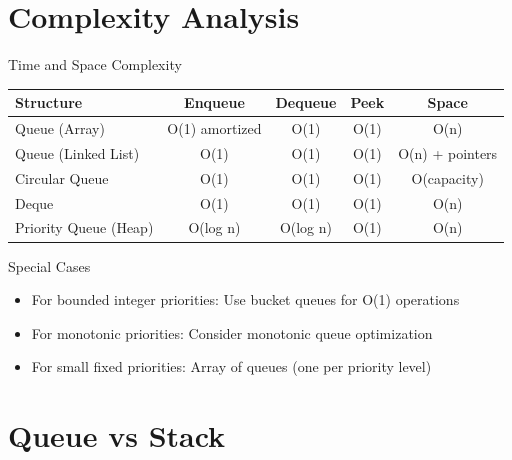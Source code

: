 \documentclass[aspectratio=169,xcolor=dvipsnames]{beamer}
\begin{document}
\section{Complexity Analysis}

\begin{frame}{Time and Space Complexity}
  \begin{center}
    \begin{tabular}{l|c|c|c|c}
      \toprule
      \textbf{Structure} & \textbf{Enqueue} & \textbf{Dequeue} & \textbf{Peek} & \textbf{Space} \\
      \midrule
      Queue (Array) & O(1) amortized & O(1) & O(1) & O(n) \\
      Queue (Linked List) & O(1) & O(1) & O(1) & O(n) + pointers \\
      Circular Queue & O(1) & O(1) & O(1) & O(capacity) \\
      Deque & O(1) & O(1) & O(1) & O(n) \\
      Priority Queue (Heap) & O(log n) & O(log n) & O(1) & O(n) \\
      \bottomrule
    \end{tabular}
  \end{center}

  \vspace{0.5cm}

  \begin{block}{Special Cases}
    \begin{itemize}
      \item For bounded integer priorities: Use bucket queues for O(1) operations
      \item For monotonic priorities: Consider monotonic queue optimization
      \item For small fixed priorities: Array of queues (one per priority level)
    \end{itemize}
  \end{block}
\end{frame}

\section{Queue vs Stack}
\end{document}
